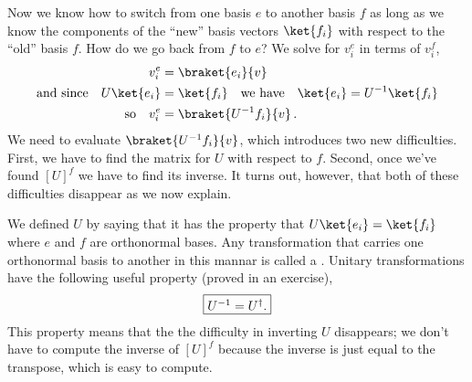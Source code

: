 Now we know how to switch from one basis $e$ to another basis $f$ as long as we know the components of the ``new'' basis vectors $\ket{f_i}$ with respect to the ``old'' basis $f$.
How do we go back from $f$ to $e$?
We solve for $v_i^e$ in terms of $v_i^f$,
\begin{align*}
  v_i^e &= \braket{e_i}{v} \\
  \textrm{and since} \quad
    U\ket{e_i} &= \ket{f_i} \quad
    \textrm{we have} \quad \ket{e_i} = U^{-1}\ket{f_i} \\
  \textrm{so} \quad v_i^e &= \braket{U^{-1}f_i}{v} \,.
\end{align*}
We need to evaluate $\braket{U^{-1}f_i}{v}$, which introduces two new difficulties.
First, we have to find the matrix for $U$ with respect to $f$.
Second, once we've found $[U]^f$ we have to find its inverse.
It turns out, however, that both of these difficulties disappear as we now explain.

We defined $U$ by saying that it has the property that $U\ket{e_i} = \ket{f_i}$ where $e$ and $f$ are orthonormal bases.
Any transformation that carries one orthonormal basis to another in this mannar is called a .
Unitary transformations have the following useful property (proved in an exercise),
\begin{displaymath}
  \framebox{$U^{-1} = U^{\dag}$.}
\end{displaymath}
This property means that the the difficulty in inverting $U$ disappears; we don't have to compute the inverse of $[U]^f$ because the inverse is just equal to the transpose, which is easy to compute.

